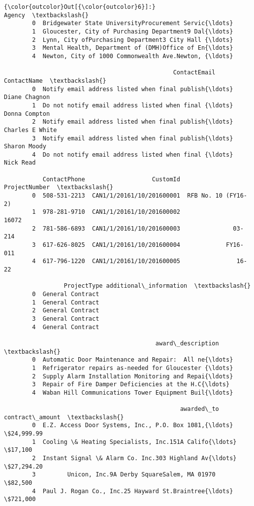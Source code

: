 \documentclass[11pt]{article}
\begin{document}
\begin{Verbatim}[commandchars=\\\{\}]
{\color{outcolor}Out[{\color{outcolor}6}]:}                                               Agency  \textbackslash{}
        0  Bridgewater State UniversityProcurement Servic{\ldots}   
        1  Gloucester, City of Purchasing Department9 Dal{\ldots}   
        2  Lynn, City ofPurchasing Department3 City Hall {\ldots}   
        3  Mental Health, Department of (DMH)Office of En{\ldots}   
        4  Newton, City of 1000 Commonwealth Ave.Newton, {\ldots}   
        
                                                ContactEmail      ContactName  \textbackslash{}
        0  Notify email address listed when final publish{\ldots}    Diane Chagnon   
        1  Do not notify email address listed when final {\ldots}    Donna Compton   
        2  Notify email address listed when final publish{\ldots}  Charles E White   
        3  Notify email address listed when final publish{\ldots}     Sharon Moody   
        4  Do not notify email address listed when final {\ldots}        Nick Read   
        
           ContactPhone                   CustomId        ProjectNumber  \textbackslash{}
        0  508-531-2213  CAN1/1/20161/10/201600001  RFB No. 10 (FY16-2)   
        1  978-281-9710  CAN1/1/20161/10/201600002                16072   
        2  781-586-6893  CAN1/1/20161/10/201600003               03-214   
        3  617-626-8025  CAN1/1/20161/10/201600004             FY16-011   
        4  617-796-1220  CAN1/1/20161/10/201600005                16-22   
        
                 ProjectType additional\_information  \textbackslash{}
        0  General Contract                           
        1  General Contract                           
        2  General Contract                           
        3  General Contract                           
        4  General Contract                           
        
                                           award\_description  \textbackslash{}
        0  Automatic Door Maintenance and Repair:  All ne{\ldots}   
        1  Refrigerator repairs as-needed for Gloucester {\ldots}   
        2  Supply Alarm Installation Monitoring and Repai{\ldots}   
        3  Repair of Fire Damper Deficiencies at the H.C{\ldots}   
        4  Waban Hill Communications Tower Equipment Buil{\ldots}   
        
                                                  awarded\_to contract\_amount  \textbackslash{}
        0  E.Z. Access Door Systems, Inc., P.O. Box 1081,{\ldots}      \$24,999.99   
        1  Cooling \& Heating Specialists, Inc.151A Califo{\ldots}         \$17,100   
        2  Instant Signal \& Alarm Co. Inc.303 Highland Av{\ldots}      \$27,294.20   
        3         Unicon, Inc.9A Derby SquareSalem, MA 01970         \$82,500   
        4  Paul J. Rogan Co., Inc.25 Hayward St.Braintree{\ldots}        \$721,000   
        

\end{Verbatim}
\end{document}
